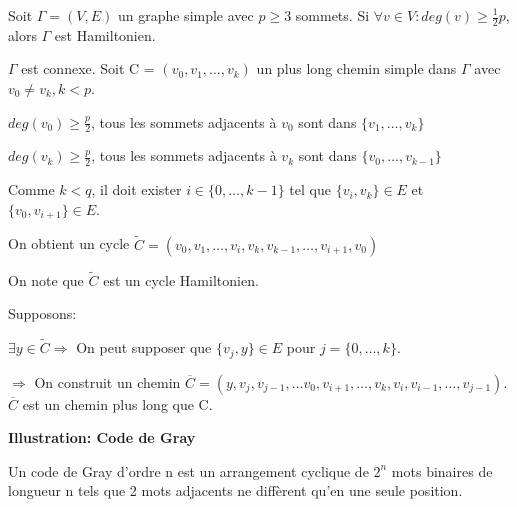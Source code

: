 \begin{exmp}

\end{exmp}




\newpage

\begin{thrm}[Dirac 1950]
Soit $\Gamma = (V,E)$ un graphe simple avec $p \geq 3$ sommets. Si $\forall v \in V: deg(v) \geq \frac{1}{2}p$, alors $\Gamma$ est Hamiltonien.
\end{thrm}

\begin{demo}
$\Gamma$ est connexe. Soit C = $(v_{0},v_{1},\ldots,v_{k})$ un plus long chemin simple dans $\Gamma$ avec $v_{0} \neq v_{k}, k < p$.

$ deg(v_{0}) \geq \frac{p}{2}$, tous les sommets adjacents à $v_{0}$ sont dans $\{v_{1},\ldots,v_{k}\}$

$ deg(v_{k}) \geq \frac{p}{2}$, tous les sommets adjacents à $v_{k}$ sont dans $\{v_{0},\ldots,v_{k-1}\}$

Comme $k < q$, il doit exister $i \in \{0,\ldots,k-1\}$ tel que $\{v_{i},v_{k}\} \in E$ et $\{v_{0},v_{i+1}\} \in E$. 

On obtient un cycle $\widetilde{C} = (v_{0},v_{1},\ldots,v_{i},v_{k},v_{k-1},\ldots,v_{i+1},v_{0})$ 



On note que $\widetilde{C}$ est un cycle Hamiltonien.

Supposons:

$\exists  y \in \widetilde{C} \Rightarrow$ On peut supposer que $\{ v_{j},y\} \in E$ pour $j=\{0,\ldots,k\}$.

$\Rightarrow$ On construit un chemin $\overline{C} = (y, v_{j},v_{j-1},\ldots v_{0},v_{i+1},\ldots,v_{k},v_{i},v_{i-1},\ldots,v_{j-1})$. $\overline{C}$ est un chemin plus long que C. 



\end{demo}

\newpage

\textbf{Illustration: Code de Gray}

Un code de Gray d'ordre n est un arrangement cyclique de $2^{n}$ mots binaires de longueur n tels que 2 mots adjacents ne diffèrent qu'en une seule position.


